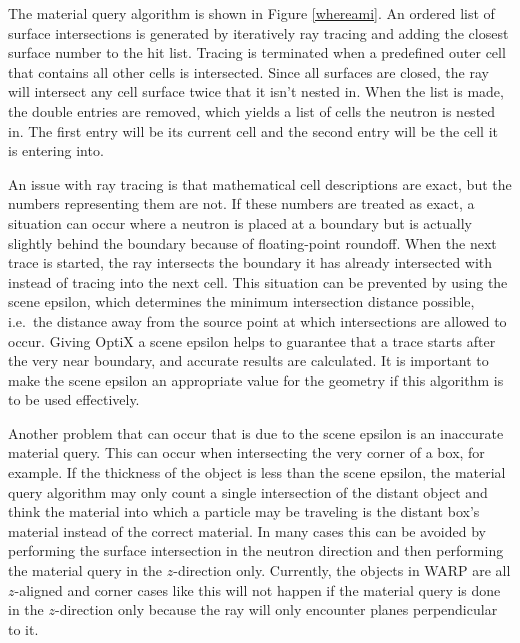 The material query algorithm is shown in Figure \ref{whereami}.  An ordered list of surface intersections is generated by iteratively ray tracing and adding the closest surface number to the hit list.  Tracing is terminated when a predefined outer cell that contains all other cells is intersected.  Since all surfaces are closed, the ray will intersect any cell surface twice that it isn't nested in.  When the list is made, the double entries are removed, which yields a list of cells the neutron is nested in.  The first entry will be its current cell and the second entry will be the cell it is entering into.  

An issue with ray tracing is that mathematical cell descriptions are exact, but the numbers representing them are not. If these numbers are treated as exact, a situation can occur where a neutron is placed at a boundary but is actually slightly behind the boundary because of floating-point roundoff.  When the next trace is started, the ray intersects the boundary it has already intersected with instead of tracing into the next cell.  This situation can be prevented by using the scene epsilon, which determines the minimum intersection distance possible, i.e.\ the distance away from the source point at which intersections are allowed to occur.  Giving OptiX a scene epsilon helps to guarantee that a trace starts after the very near boundary, and accurate results are calculated.  It is important to make the scene epsilon an appropriate value for the geometry if this algorithm is to be used effectively. 

Another problem that can occur that is due to the scene epsilon is an inaccurate material query.  This can occur when intersecting the very corner of a box, for example. If the thickness of the object is less than the scene epsilon, the material query algorithm may only count a single intersection of the distant object and think the material into which a particle may be traveling is the distant box's material instead of the correct material.  In many cases this can be avoided by performing the surface intersection in the neutron direction and then performing the material query in the $z$-direction only.  Currently, the objects in WARP are all $z$-aligned and corner cases like this will not happen if the material query is done in the $z$-direction only because the ray will only encounter planes perpendicular to it.  %

